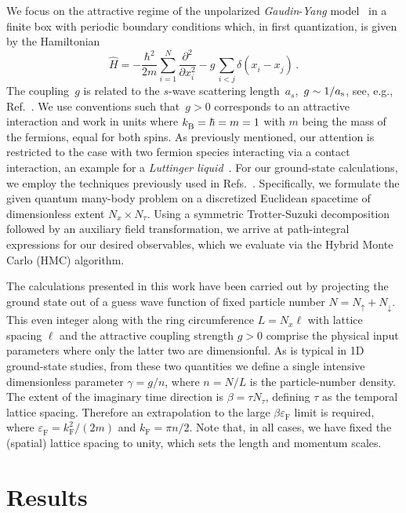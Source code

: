 \documentclass[pra,aps,groupedaddress,floatfix,twocolumn,superscriptaddress,showpacs,nofootinbib]{revtex4-1}
\newcommand{\beq}{\begin{equation}}
\newcommand{\eeq}{\end{equation}}
\newcommand{\veps}{\varepsilon}
\begin{document}
{We focus on the attractive regime of the unpolarized {\it Gaudin}-{\it Yang}
model~\cite{PhysRevLett.19.1312,*GAUDIN196755}
{in a finite box with periodic boundary}
conditions which, in first quantization, is given by the Hamiltonian
%
\beq
\label{Eq:H}
\hat H = -\frac{\hbar^2}{2 m}\sum_{i=1}^{N}\frac{\partial^2}{\partial x_i^2} - g\,\sum_{i<j}{\delta(x^{}_i-x^{}_j)}\,.
\eeq
%
The coupling~$g$ is related to the $s$-wave scattering length~$a_{s}$,~$g\sim 1/a_{\rm s}$,
see, e.g., Ref.~\cite{2000EJPh21.435B}.
{We use conventions such that~$g >0$ corresponds to an
attractive {interaction and work} in units where $k^{}_\textnormal{B} = \hbar = m = 1$ with $m$ being the
mass of the fermions, equal for both spins. As previously mentioned, our
attention is restricted to {the case with two fermion species interacting via a contact interaction, an}
example for a \emph{Luttinger liquid}~\cite{1963JMP.....4.1154L}.}
For our ground-state calculations, we employ the
techniques previously used {in Refs.~\cite{GCS1D, ImprovedActionsDrut, GCS2D}.  Specifically, we} formulate the
given quantum many-body problem on a discretized Euclidean spacetime of dimensionless extent $N^{}_x \times N^{}_\tau$.
Using a symmetric Trotter-Suzuki decomposition followed by an auxiliary field transformation, we arrive at path-integral expressions for our desired observables,
which we evaluate via the {Hybrid Monte} Carlo (HMC) algorithm.

{The calculations presented in this work have been}
carried out by projecting the ground state out of a guess wave function of fixed particle number $N = N^{}_{\uparrow} + N^{}_{\downarrow}$.
This even integer along with the ring circumference $L = N^{}_{x} \ell$ with lattice spacing $\ell$ and the attractive coupling {strength $g > 0 $ comprise}
the physical input parameters where only the latter two are dimensionful. As is typical in 1D ground-state studies,
from these two quantities we define a single intensive {dimensionless parameter $\gamma= g/n$,
where $n = N/L$ is} the particle-number density. {The extent of the imaginary time direction is $\beta = \tau N^{}_{\tau}$,
defining $\tau$ as the temporal lattice spacing.  Therefore an extrapolation to the large $\beta \veps^{}_{\text{F}}$ limit is required,
where $\veps^{}_{\text{F}} = k^{2}_{\text{F}}/(2 m)$ and $k^{}_{\text{F}} = \pi n/2$.
Note that, in all cases, we have fixed the (spatial) lattice spacing to unity, {which sets the}
length and momentum scales.}

\section{Results}\label{sec:res}

}
\end{document}
